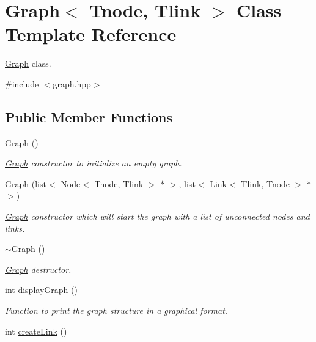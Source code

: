 \hypertarget{classGraph}{}\section{Graph$<$ Tnode, Tlink $>$ Class Template Reference}
\label{classGraph}


\hyperlink{classGraph}{Graph} class.  




{\ttfamily \#include $<$graph.\+hpp$>$}

\subsection*{Public Member Functions}
\begin{DoxyCompactItemize}
\item 
\hyperlink{classGraph_a083bf42042f9082408dd0d38951bf0e8}{Graph} ()
\begin{DoxyCompactList}\small\item\em \hyperlink{classGraph}{Graph} constructor to initialize an empty graph. \end{DoxyCompactList}\item 
\hyperlink{classGraph_aaa7b66697aa3278022f6dbd804e44028}{Graph} (list$<$ \hyperlink{classNode}{Node}$<$ Tnode, Tlink $>$ $\ast$ $>$, list$<$ \hyperlink{classLink}{Link}$<$ Tlink, Tnode $>$ $\ast$ $>$)\hypertarget{classGraph_aaa7b66697aa3278022f6dbd804e44028}{}\label{classGraph_aaa7b66697aa3278022f6dbd804e44028}

\begin{DoxyCompactList}\small\item\em \hyperlink{classGraph}{Graph} constructor which will start the graph with a list of unconnected nodes and links. \end{DoxyCompactList}\item 
\hyperlink{classGraph_a33e89e1711a29888c0059c7fd2d67cba}{$\sim$\+Graph} ()
\begin{DoxyCompactList}\small\item\em \hyperlink{classGraph}{Graph} destructor. \end{DoxyCompactList}\item 
int \hyperlink{classGraph_a50e03d4d8fe8e7ff2a231871f8cd6356}{display\+Graph} ()
\begin{DoxyCompactList}\small\item\em Function to print the graph structure in a graphical format. \end{DoxyCompactList}\item 
int \hyperlink{classGraph_a495ce01388ef7c259ab3c35f2414bd76}{create\+Link} ()\hypertarget{classGraph_a495ce01388ef7c259ab3c35f2414bd76}{}\label{classGraph_a495ce01388ef7c259ab3c35f2414bd76}


\end{DoxyCompactItemize}
